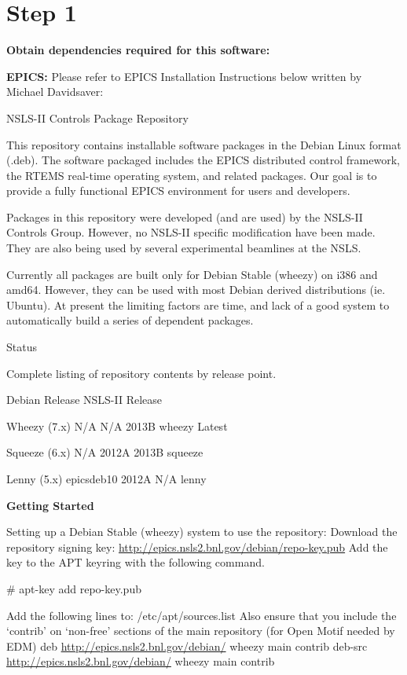 \documentclass[letterpaper,10pt,english]{sphinxmanual}
\begin{document}
\section{Step 1}
\label{Installation:step-1}
\textbf{Obtain dependencies required for this software:}

\textbf{EPICS:}
Please refer to EPICS Installation Instructions below written by Michael Davidsaver:

NSLS-II Controls Package Repository

This repository contains installable software packages in the Debian Linux format (.deb). The software packaged includes the EPICS distributed control framework, the RTEMS real-time operating system, and related packages. Our goal is to provide a fully functional EPICS environment for users and developers.

Packages in this repository were developed (and are used) by the NSLS-II Controls Group. However, no NSLS-II specific modification have been made. They are also being used by several experimental beamlines at the NSLS.

Currently all packages are built only for Debian Stable (wheezy) on i386 and amd64. However, they can be used with most Debian derived distributions (ie. Ubuntu). At present the limiting factors are time, and lack of a good system to automatically build a series of dependent packages.

Status

Complete listing of repository contents by release point.

Debian Release  NSLS-II Release

Wheezy (7.x)    N/A     N/A     2013B   wheezy  Latest

Squeeze (6.x)   N/A     2012A   2013B   squeeze

Lenny (5.x)     epicsdeb10      2012A   N/A     lenny

\textbf{Getting Started}

Setting up a Debian Stable (wheezy) system to use the repository:
Download the repository signing key: \href{http://epics.nsls2.bnl.gov/debian/repo-key.pub}{http://epics.nsls2.bnl.gov/debian/repo-key.pub}
Add the key to the APT keyring with the following command.

\# apt-key add repo-key.pub

Add the following lines to: /etc/apt/sources.list Also ensure that you include the `contrib' on `non-free' sections of the main repository (for Open Motif needed by EDM)
deb \href{http://epics.nsls2.bnl.gov/debian/}{http://epics.nsls2.bnl.gov/debian/} wheezy main contrib
deb-src \href{http://epics.nsls2.bnl.gov/debian/}{http://epics.nsls2.bnl.gov/debian/} wheezy main contrib
\end{document}
